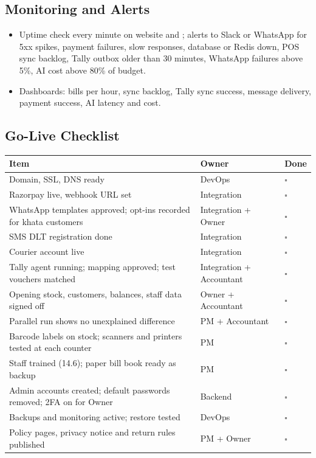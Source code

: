\documentclass[11pt,a4paper]{article}
\newcommand{\code}[1]{\texttt{\detokenize{#1}}}
\newcommand{\chk}{$\square$}
\newcommand{\hdr}{\rowcolor{hdrgray}\bfseries}
\begin{document}
\subsection{Monitoring and Alerts}
\begin{itemize}
\item Uptime check every minute on website and \code{/health}; alerts to Slack or WhatsApp for 5xx spikes, payment failures, slow responses, database or Redis down, POS sync backlog, Tally outbox older than 30 minutes, WhatsApp failures above 5\%, AI cost above 80\% of budget.
\item Dashboards: bills per hour, sync backlog, Tally sync success, message delivery, payment success, AI latency and cost.
\end{itemize}

\subsection{Go-Live Checklist}
\begin{longtable}{L{10.5cm}L{4.4cm}L{1.6cm}}
\hdr Item & Owner & Done \\ \endhead
Domain, SSL, DNS ready & DevOps & \chk \\
Razorpay live, webhook URL set & Integration & \chk \\
WhatsApp templates approved; opt-ins recorded for khata customers & Integration + Owner & \chk \\
SMS DLT registration done & Integration & \chk \\
Courier account live & Integration & \chk \\
Tally agent running; mapping approved; test vouchers matched & Integration + Accountant & \chk \\
Opening stock, customers, balances, staff data signed off & Owner + Accountant & \chk \\
Parallel run shows no unexplained difference & PM + Accountant & \chk \\
Barcode labels on stock; scanners and printers tested at each counter & PM & \chk \\
Staff trained (14.6); paper bill book ready as backup & PM & \chk \\
Admin accounts created; default passwords removed; 2FA on for Owner & Backend & \chk \\
Backups and monitoring active; restore tested & DevOps & \chk \\
Policy pages, privacy notice and return rules published & PM + Owner & \chk \\
\end{longtable}
\end{document}
